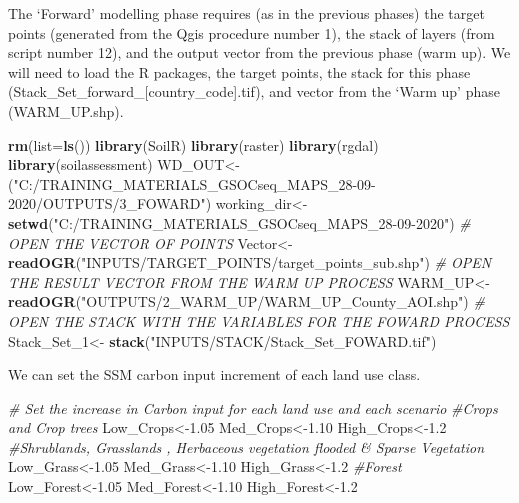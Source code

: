 \documentclass[
  10pt,
  b5paper,
]{book}
\newenvironment{Shaded}{\begin{snugshade}}{\end{snugshade}}
\newcommand{\CommentTok}[1]{\textcolor[rgb]{0.56,0.35,0.01}{\textit{#1}}}
\newcommand{\DataTypeTok}[1]{\textcolor[rgb]{0.13,0.29,0.53}{#1}}
\newcommand{\DecValTok}[1]{\textcolor[rgb]{0.00,0.00,0.81}{#1}}
\newcommand{\FloatTok}[1]{\textcolor[rgb]{0.00,0.00,0.81}{#1}}
\newcommand{\KeywordTok}[1]{\textcolor[rgb]{0.13,0.29,0.53}{\textbf{#1}}}
\newcommand{\NormalTok}[1]{#1}
\newcommand{\StringTok}[1]{\textcolor[rgb]{0.31,0.60,0.02}{#1}}
\begin{document}
The `Forward' modelling phase requires (as in the previous phases) the target points (generated from the Qgis procedure number 1), the stack of layers (from script number 12), and the output vector from the previous phase (warm up). We will need to load the R packages, the target points, the stack for this phase (Stack\_Set\_forward\_{[}country\_code{]}.tif), and vector from the `Warm up' phase (WARM\_UP.shp).

\begin{Shaded}
\begin{Highlighting}[]
\KeywordTok{rm}\NormalTok{(}\DataTypeTok{list=}\KeywordTok{ls}\NormalTok{()) }
\KeywordTok{library}\NormalTok{(SoilR)}
\KeywordTok{library}\NormalTok{(raster)}
\KeywordTok{library}\NormalTok{(rgdal)}
\KeywordTok{library}\NormalTok{(soilassessment)}
\NormalTok{WD_OUT<-(}\StringTok{"C:/TRAINING_MATERIALS_GSOCseq_MAPS_28-09-2020/OUTPUTS/3_FOWARD"}\NormalTok{)}
\NormalTok{working_dir<-}\KeywordTok{setwd}\NormalTok{(}\StringTok{"C:/TRAINING_MATERIALS_GSOCseq_MAPS_28-09-2020"}\NormalTok{)}
\CommentTok{# OPEN THE VECTOR OF POINTS}
\NormalTok{Vector<-}\KeywordTok{readOGR}\NormalTok{(}\StringTok{"INPUTS/TARGET_POINTS/target_points_sub.shp"}\NormalTok{)}
\CommentTok{# OPEN THE RESULT VECTOR FROM THE WARM UP PROCESS}
\NormalTok{WARM_UP<-}\KeywordTok{readOGR}\NormalTok{(}\StringTok{"OUTPUTS/2_WARM_UP/WARM_UP_County_AOI.shp"}\NormalTok{)}
\CommentTok{# OPEN THE STACK WITH THE VARIABLES FOR THE FOWARD PROCESS}
\NormalTok{Stack_Set_}\DecValTok{1}\NormalTok{<-}\StringTok{ }\KeywordTok{stack}\NormalTok{(}\StringTok{"INPUTS/STACK/Stack_Set_FOWARD.tif"}\NormalTok{)}
\end{Highlighting}
\end{Shaded}

We can set the SSM carbon input increment of each land use class.

\begin{Shaded}
\begin{Highlighting}[]
\CommentTok{# Set the increase in Carbon input for each land use and each scenario}
\CommentTok{#Crops and Crop trees}
\NormalTok{Low_Crops<-}\FloatTok{1.05}
\NormalTok{Med_Crops<-}\FloatTok{1.10}
\NormalTok{High_Crops<-}\FloatTok{1.2}
\CommentTok{#Shrublands, Grasslands , Herbaceous vegetation flooded & Sparse Vegetation}
\NormalTok{Low_Grass<-}\FloatTok{1.05}
\NormalTok{Med_Grass<-}\FloatTok{1.10}
\NormalTok{High_Grass<-}\FloatTok{1.2}
\CommentTok{#Forest}
\NormalTok{Low_Forest<-}\FloatTok{1.05}
\NormalTok{Med_Forest<-}\FloatTok{1.10}
\NormalTok{High_Forest<-}\FloatTok{1.2}
\end{Highlighting}
\end{Shaded}
\end{document}

